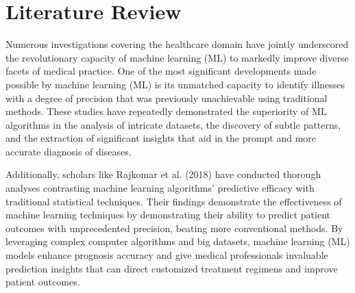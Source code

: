 \documentclass[conference]{IEEEtran}
\begin{document}
\section{Literature Review}
\label{literature}
    Numerous investigations covering the healthcare domain have jointly underscored the revolutionary capacity of machine learning (ML) to markedly improve diverse facets of medical practice. One of the most significant developments made possible by machine learning (ML) is its unmatched capacity to identify illnesses with a degree of precision that was previously unachievable using traditional methods. These studies have repeatedly demonstrated the superiority of ML algorithms in the analysis of intricate datasets, the discovery of subtle patterns, and the extraction of significant insights that aid in the prompt and more accurate diagnosis of diseases.

   Additionally, scholars like Rajkomar et al. (2018) \cite{rajkomar2018scalable} have conducted thorough analyses contrasting machine learning algorithms' predictive efficacy with traditional statistical techniques. Their findings demonstrate the effectiveness of machine learning techniques by demonstrating their ability to predict patient outcomes with unprecedented precision, beating more conventional methods. By leveraging complex computer algorithms and big datasets, machine learning (ML) models enhance prognosis accuracy and give medical professionals invaluable prediction insights that can direct customized treatment regimens and improve patient outcomes.
\end{document}
